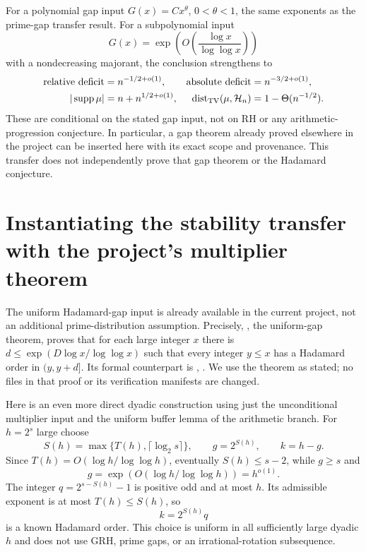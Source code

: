 \documentclass[11pt]{article}
\begin{document}
For a polynomial gap input $G(x)=Cx^\theta$, $0<\theta<1$, the same
exponents as the prime-gap transfer result. For a subpolynomial input
\[
 G(x)=\exp\!\left(O\!\left(\frac{\log x}{\log\log x}\right)\right)
\]
with a nondecreasing majorant, the conclusion strengthens to
\begin{align*}
 \text{relative deficit}&=n^{-1/2+o(1)},&
 \text{absolute deficit}&=n^{-3/2+o(1)},\\
 |\operatorname{supp}\mu|&=n+n^{1/2+o(1)},&
 \operatorname{dist}_{\rm TV}(\mu,\mathcal H_n)&=1-\Theta(n^{-1/2}).
\end{align*}
These are conditional on the stated gap input, not on RH or any
arithmetic-progression conjecture. In particular, a gap theorem already
proved elsewhere in the project can be inserted here with its exact
scope and provenance. This transfer does not independently prove that
gap theorem or the Hadamard conjecture.
\section{Instantiating the stability transfer with the project's multiplier theorem}
\label{sec:stability-project-input}

The uniform Hadamard-gap input is already available in the current
project, not an additional prime-distribution assumption. Precisely,
, the uniform-gap
theorem, proves that for each large integer $x$ there is
$d\le\exp(D\log x/\log\log x)$ such that every integer $y\le x$ has a
Hadamard order in $(y,y+d]$. Its formal counterpart is
,
. We use the theorem as stated;
no files in that proof or its verification manifests are changed.

Here is an even more direct dyadic construction using just the
unconditional multiplier input and the uniform buffer lemma of the
arithmetic branch. For $h=2^s$ large choose
\[
 S(h)=\max\{T(h),\lceil\log_2s\rceil\},\qquad
 g=2^{S(h)},\qquad k=h-g.
\]
Since $T(h)=O(\log h/\log\log h)$, eventually
$S(h)\le s-2$, while $g\ge s$ and
\[
                 g=\exp(O(\log h/\log\log h))=h^{o(1)}.
\]
The integer $q=2^{s-S(h)}-1$ is positive odd and at most $h$.
Its admissible exponent is at most $T(h)\le S(h)$, so
\[
                    k=2^{S(h)}q
\]
is a known Hadamard order. This choice is uniform in all sufficiently
large dyadic $h$ and does not use GRH, prime gaps, or an
irrational-rotation subsequence.
\end{document}
